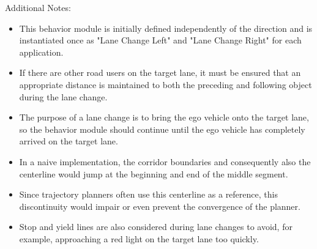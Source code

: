 Additional Notes:

\begin{itemize}
    \item This behavior module is initially defined independently of the direction and is instantiated once as "Lane Change Left" and "Lane Change Right" for each application.
    \item If there are other road users on the target lane, it must be ensured that an appropriate distance is maintained to both the preceding and following object during the lane change.
    \item The purpose of a lane change is to bring the ego vehicle onto the target lane, so the behavior module should continue until the ego vehicle has completely arrived on the target lane.
    \item In a naive implementation, the corridor boundaries and consequently also the centerline would jump at the beginning and end of the middle segment.
    \item Since trajectory planners often use this centerline as a reference, this discontinuity would impair or even prevent the convergence of the planner.
    \item Stop and yield lines are also considered during lane changes to avoid, for example, approaching a red light on the target lane too quickly.
\end{itemize}
